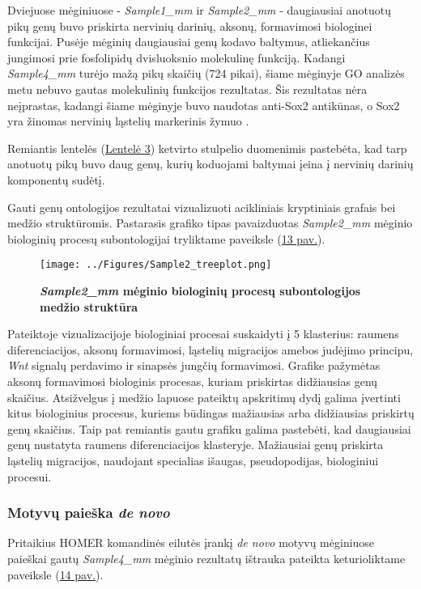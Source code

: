 \documentclass[12pt]{article}
\begin{document}
Dviejuose mėginiuose - \emph{Sample1\_mm} ir \emph{Sample2\_mm} - daugiausiai
anotuotų pikų genų buvo priskirta nervinių darinių, aksonų, formavimosi
biologinei funkcijai. Pusėje mėginių daugiausiai genų kodavo baltymus,
atliekančius jungimosi prie fosfolipidų dvisluoksnio molekulinę funkciją.
Kadangi \emph{Sample4\_mm} turėjo mažą pikų skaičių  (724 pikai), šiame mėginyje
GO analizės metu nebuvo gautas molekulinių funkcijos rezultatas. Šis rezultatas
nėra neįprastas, kadangi šiame mėginyje buvo naudotas anti-Sox2 antikūnas, o
Sox2 yra žinomas nervinių ląstelių markerinis žymuo \cite{ARTICLE21}.

Remiantis lentelės (\hyperref[table:go_results]{Lentelė 3}) ketvirto stulpelio
duomenimis pastebėta, kad tarp anotuotų pikų buvo daug genų, kurių koduojami
baltymai įeina į nervinių darinių komponentų sudėtį.

Gauti genų ontologijos rezultatai vizualizuoti acikliniais kryptiniais grafais
bei medžio struk\-tū\-ro\-mis. Pastarasis grafiko tipas pavaizduotas 
\emph{Sample2\_mm} mėginio biologinių procesų subontologijai tryliktame
paveiksle (\hyperref[fig:image13]{13 pav.}).

\begin{figure}[H]
    \begin{center}
        \texttt{[image: ../Figures/Sample2\_treeplot.png]}
        \vspace{-1.5\baselineskip}
        \caption{\small\textbf{\emph{Sample2\_mm} mėginio biologinių
                                procesų subontologijos medžio struktūra}}
        \label{fig:image13}
    \end{center}
\end{figure}

Pateiktoje vizualizacijoje biologiniai procesai suskaidyti į 5 klasterius:
raumens diferenciacijos, aksonų formavimosi, ląstelių migracijos amebos
judėjimo principu, \emph{Wnt} signalų perdavimo ir sinapsės jungčių formavimosi.
Grafike pažymėtas aksonų formavimosi biologinis procesas, kuriam priskirtas
didžiausias genų skaičius. Atsižvelgus į medžio lapuose pateiktų apskritimų
dydį galima įvertinti kitus biologinius procesus, kuriems būdingas mažiausias
arba didžiausias priskirtų genų skaičius. Taip pat remiantis gautu grafiku
galima pastebėti, kad daugiausiai genų nustatyta raumens diferenciacijos
klasteryje. Mažiausiai genų priskirta ląstelių migracijos, naudojant
specialias išaugas, pseudopodijas, biologiniui procesui.

\subsubsection*{Motyvų paieška \emph{de novo}}
Pritaikius HOMER komandinės eilutės įrankį \emph{de novo} motyvų mėginiuose
paieškai gautų \emph{Sample4\_mm} mėginio rezultatų ištrauka pateikta
keturioliktame paveiksle (\hyperref[fig:image14]{14 pav.}).
\end{document}
